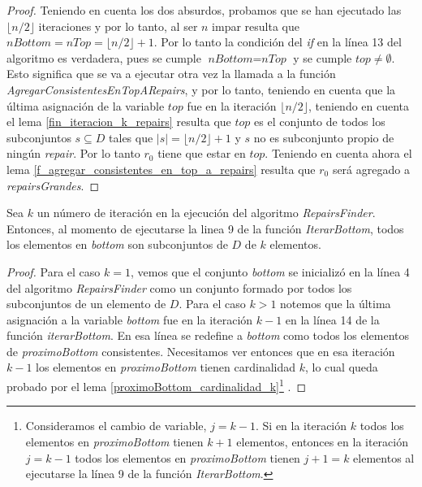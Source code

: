 \documentclass[11pt,a4paper,twoside]{tesis}
\newcommand{\parteEntera}{\lfloor n/2 \rfloor}
\begin{document}
\begin{proof}
Teniendo en cuenta los dos absurdos, probamos que se han ejecutado las $\parteEntera$ iteraciones y por lo tanto, al ser $n$ impar resulta que $\textit{nBottom} = \textit{nTop} = \parteEntera + 1$. Por lo tanto la condición del \textit{if} en la línea 13 del algoritmo es verdadera, pues se cumple $\textit{nBottom} = \textit{nTop}$ y se cumple $\textit{top} \neq \emptyset$. Esto significa que se va a ejecutar otra vez la llamada a la función \textit{AgregarConsistentesEnTopARepairs}, y por lo tanto, teniendo en cuenta que la última asignación de la variable $\textit{top}$ fue en la iteración $\parteEntera$, teniendo en cuenta el lema \ref{fin_iteracion_k_repairs} resulta que $\textit{top}$ es el conjunto de todos los subconjuntos $s \subseteq D$ tales que $|s| = \parteEntera + 1$ y $s$ no es subconjunto propio de ningún \textit{repair}. Por lo tanto $r_0$ tiene que estar en $\textit{top}$. Teniendo en cuenta ahora el lema \ref{f_agregar_consistentes_en_top_a_repairs} resulta que $r_0$ será agregado a \textit{repairsGrandes}.
\end{proof}

\begin{lemma}\label{bottom_cardinalidad_k}
Sea $k$ un número de iteración en la ejecución del algoritmo \textit{RepairsFinder}. Entonces, al momento de ejecutarse la linea 9 de la función \textit{IterarBottom}, todos los elementos en \textit{bottom} son subconjuntos de $D$ de $k$ elementos.
\end{lemma}

\begin{proof}
Para el caso $k = 1$, vemos que el conjunto \textit{bottom} se inicializó en la línea 4 del algoritmo \textit{RepairsFinder} como un conjunto formado por todos los subconjuntos de un elemento de $D$. Para el caso $k>1$ notemos que la última asignación a la variable \textit{bottom} fue en la iteración $k-1$ en la línea 14 de la función \textit{iterarBottom}. En esa línea se redefine a \textit{bottom} como todos los elementos de \textit{proximoBottom} consistentes. Necesitamos ver entonces que en esa iteración $k-1$ los elementos en \textit{proximoBottom} tienen cardinalidad $k$, lo cual queda probado por el lema \ref{proximoBottom_cardinalidad_k}\footnote{Consideramos el cambio de variable, $j = k-1$. Si en la iteración $k$ todos los elementos en \textit{proximoBottom} tienen $k+1$ elementos, entonces en la iteración $j = k-1$ todos los elementos en \textit{proximoBottom} tienen $j + 1 = k$ elementos al ejecutarse la línea 9 de la función \textit{IterarBottom}.} .
\end{proof}
\end{document}
